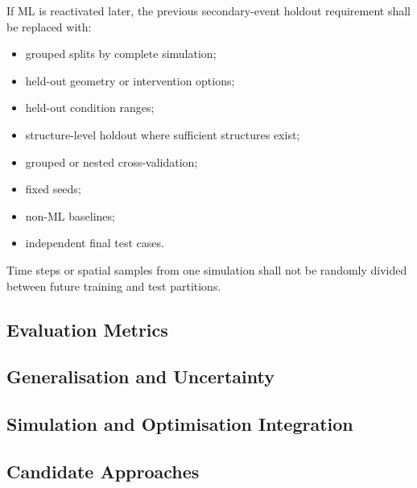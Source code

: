 If ML is reactivated later, the previous secondary-event holdout
requirement shall be replaced with:
\begin{itemize}
  \item grouped splits by complete simulation;
  \item held-out geometry or intervention options;
  \item held-out condition ranges;
  \item structure-level holdout where sufficient structures exist;
  \item grouped or nested cross-validation;
  \item fixed seeds;
  \item non-ML baselines;
  \item independent final test cases.
\end{itemize}

Time steps or spatial samples from one simulation shall not be randomly divided
between future training and test partitions.

\subsection{Evaluation Metrics}
\label{sec:res-ml-trn-evaluation-metrics}


\subsection{Generalisation and Uncertainty}
\label{sec:res-ml-trn-generalisation-uncertainty}


\subsection{Simulation and Optimisation Integration}
\label{sec:res-ml-trn-simulation-optimisation-integration}


\subsection{Candidate Approaches}
\label{sec:res-ml-trn-candidate-approaches}


